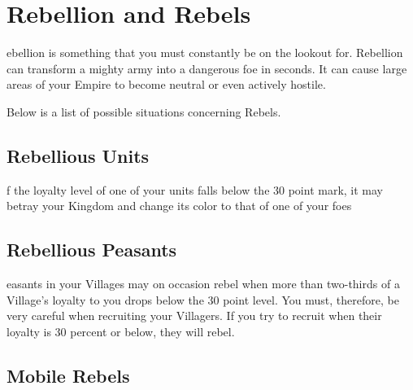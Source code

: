 
\chapter{Rebellion and Rebels}

ebellion is something that you must constantly be on the lookout for. Rebellion can transform a mighty army into a dangerous foe in seconds. It can cause large areas of your Empire to become neutral or even actively hostile.

Below is a list of possible situations concerning Rebels.

\section{Rebellious Units}

f the loyalty level of one of your units falls below the 30 point mark, it may betray your Kingdom and change its color to that of one of your foes

\section{Rebellious Peasants}

easants in your Villages may on occasion rebel when more than two-thirds of a Village’s loyalty to you drops below the 30 point level. You must, therefore, be very careful when recruiting your Villagers. If you try to recruit when their loyalty is 30 percent or below, they will rebel.

\section{Mobile Rebels}

